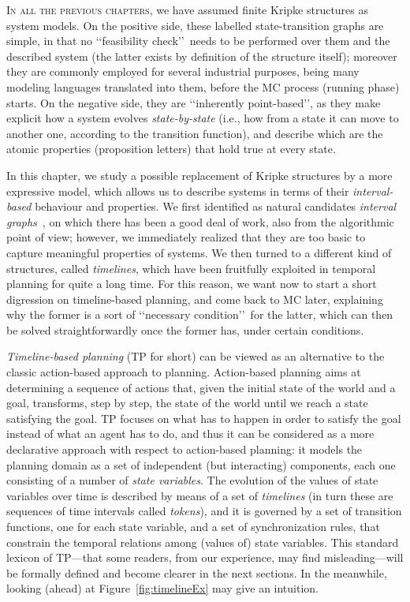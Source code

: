 
\lettrine[lines=3]{I}{n all the previous chapters,} we have assumed finite Kripke structures as system models.
On the positive side, these labelled state-transition graphs are simple, in that no \lq\lq feasibility check\rq\rq\ needs to
be performed over them and the described system (the latter exists by definition of the structure itself); moreover they are commonly employed for several industrial purposes, being many modeling languages translated into them, before the MC process (running phase) starts.
%
On the negative side, they are \lq\lq inherently point-based\rq\rq , as they make explicit how a system evolves \emph{state-by-state}
(i.e., how from a state it can move to another one, according to the transition function), and describe which are the atomic properties (proposition letters) that hold true at every state.

In this chapter, we study a possible replacement of Kripke structures by a more expressive model, which allows us to describe systems in terms of their \emph{interval-based} behaviour and properties.
We first identified as natural candidates \emph{interval graphs}~\cite{intvgraphs}, on which there has been a good deal of work, also from the algorithmic point of view; however, we immediately realized that they are too basic to capture meaningful properties of systems.
We then turned to a different kind of structures, 
called \emph{timelines}, which have been fruitfully exploited in temporal planning for quite a long time.
For this reason, we want now to start a short digression on timeline-based planning, and come back to MC later, explaining why the former is a sort of \lq\lq necessary condition\rq\rq\ for the latter, which can then be solved straightforwardly once the former has, under certain conditions.

\emph{Timeline-based planning} (TP for short) can be viewed as an alternative to the classic action-based approach to planning. Action-based planning aims at determining a sequence of actions that, given the initial state of the world 
and a goal, transforms, step by step, the state of the world until we reach a state satisfying the goal.  
TP focuses on what has to happen in order to satisfy the goal instead of what an agent has to do, and thus it can be considered as a more declarative approach with respect to action-based planning: it models the planning domain as a set of independent (but interacting) components, each one consisting of a number of \emph{state variables}. The evolution of the values of state variables over time is described by means of a set of \emph{timelines} (in turn these are sequences of time intervals called \emph{tokens}), and it is governed by a set of transition functions, one for each state variable, and a set of synchronization rules, that constrain the temporal relations among (values of) state variables. This standard lexicon of TP---that some readers, from our experience, may find misleading---will be formally defined and become clearer in the next sections. In the meanwhile, looking (ahead) at Figure~\ref{fig:timelineEx} may give an intuition.

